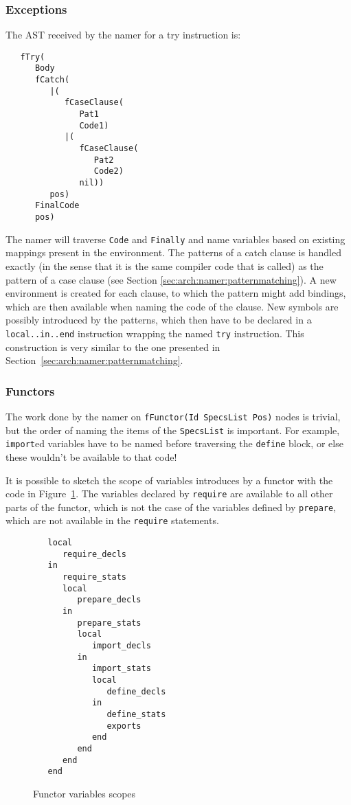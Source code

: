 \documentclass[a4paper]{memoir}
\begin{document}
\subsubsection{Exceptions}\label{sec:arch:namer:exceptions}
The AST received by the namer for a try instruction is:
\begin{lstlisting}
   fTry(
      Body
      fCatch(
         |(
            fCaseClause(
               Pat1
               Code1)
            |(
               fCaseClause(
                  Pat2
                  Code2)
               nil))
         pos)
      FinalCode
      pos)
\end{lstlisting}

The namer will traverse \lstinline!Code! and \lstinline!Finally! and name variables based on existing
mappings present in the environment. The patterns of a catch clause is
handled exactly (in the sense that it is the same compiler code that is called)
as the pattern of a case clause (see Section \ref{sec:arch:namer:patternmatching}).
A new environment is created for each clause, to which the pattern might add
bindings, which are then available when naming the code of the clause.
New symbols are possibly introduced by the patterns, which then have to be
declared in a \lstinline!local..in..end! instruction wrapping the named
\lstinline!try!  instruction. This construction is very similar to the one
presented in Section~\ref{sec:arch:namer:patternmatching}.

\subsubsection{Functors}\label{sec:arch:namer:functors}
The work done by the namer on \lstinline!fFunctor(Id SpecsList Pos)! nodes is trivial, but the
order of naming the items of the \lstinline!SpecsList! is important. For
example, \lstinline!import!ed variables have to be named before traversing the
\lstinline!define! block, or else these wouldn't be available to that code!

It is possible to sketch the scope of variables introduces by a functor with the code in
Figure~\ref{fig:functors_scope}. The variables declared by \lstinline!require!
are available to all other parts of the functor, which is not the case of the
variables defined by \lstinline!prepare!, which are not available in the
\lstinline!require! statements. 

\begin{figure}[ht]
\begin{lstlisting}
   local
      require_decls
   in
      require_stats
      local
         prepare_decls
      in
         prepare_stats
         local
            import_decls
         in
            import_stats
            local
               define_decls
            in
               define_stats
               exports
            end
         end
      end
   end
\end{lstlisting}
\caption{Functor variables scopes}
\label{fig:functors_scope}
\end{figure}
\end{document}
